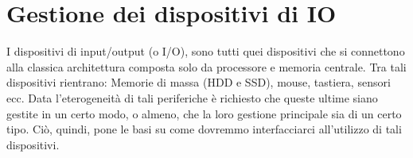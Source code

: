 \chapter{Gestione dei dispositivi di IO}
I dispositivi di input/output (o I/O), sono tutti quei dispositivi che si connettono alla classica architettura composta solo da processore e memoria centrale. Tra tali dispositivi rientrano: Memorie di massa (HDD e SSD), mouse, tastiera, sensori ecc.
Data l'eterogeneità di tali periferiche è richiesto che queste ultime siano gestite in un certo modo, o almeno, che la loro gestione principale sia di un certo tipo. Ciò, quindi, pone le basi su come dovremmo interfacciarci all'utilizzo di tali dispositivi.



